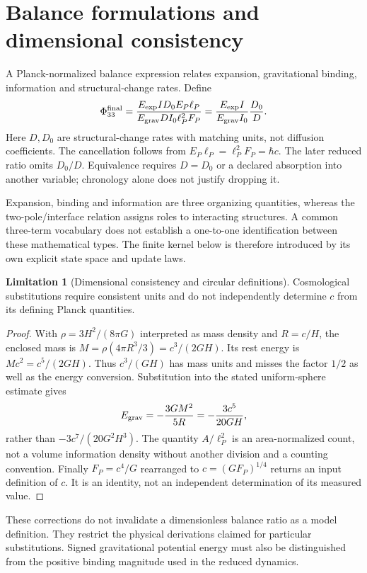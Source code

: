 \documentclass[11pt,letterpaper]{article}
\theoremstyle{definition}
\newtheorem{limitation}[theorem]{Limitation}
\numberwithin{equation}{section}
\begin{document}
\section{Balance formulations and dimensional consistency}
A Planck-normalized balance expression relates expansion, gravitational binding, information and structural-change rates. Define
\begin{equation}\label{oldratio}
\Phi_{33}^{\rm final}=
\frac{E_{\rm exp} I D_0 E_P\ell_P}{E_{\rm grav}D I_0\ell_P^2F_P}
=\frac{E_{\rm exp}I}{E_{\rm grav}I_0}\frac{D_0}{D}.
\end{equation}
Here $D,D_0$ are structural-change rates with matching units, not diffusion coefficients. The cancellation follows from $E_P\ell_P=\ell_P^2F_P=\hbar c$. The later reduced ratio omits $D_0/D$. Equivalence requires $D=D_0$ or a declared absorption into another variable; chronology alone does not justify dropping it.

Expansion, binding and information are three organizing quantities, whereas the two-pole/interface relation assigns roles to interacting structures. A common three-term vocabulary does not establish a one-to-one identification between these mathematical types. The finite kernel below is therefore introduced by its own explicit state space and update laws.

\begin{limitation}[Dimensional consistency and circular definitions]\label{historical}
Cosmological substitutions require consistent units and do not independently determine $c$ from its defining Planck quantities.
\end{limitation}
\begin{proof}
With $\rho=3H^2/(8\pi G)$ interpreted as mass density and $R=c/H$, the enclosed mass is $M=\rho(4\pi R^3/3)=c^3/(2GH)$. Its rest energy is $Mc^2=c^5/(2GH)$. Thus $c^3/(GH)$ has mass units and misses the factor $1/2$ as well as the energy conversion. Substitution into the stated uniform-sphere estimate gives
\begin{equation}
E_{\rm grav}=-\frac{3GM^2}{5R}=-\frac{3c^5}{20GH},
\end{equation}
rather than $-3c^7/(20G^2H^3)$. The quantity $A/\ell_P^2$ is an area-normalized count, not a volume information density without another division and a counting convention. Finally $F_P=c^4/G$ rearranged to $c=(GF_P)^{1/4}$ returns an input definition of $c$. It is an identity, not an independent determination of its measured value.
\end{proof}
These corrections do not invalidate a dimensionless balance ratio as a model definition. They restrict the physical derivations claimed for particular substitutions. Signed gravitational potential energy must also be distinguished from the positive binding magnitude used in the reduced dynamics.
\end{document}

